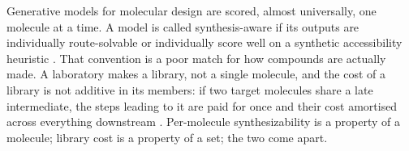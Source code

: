 \documentclass{article}
\begin{document}
%
%
%
%
%

Generative models for molecular design are scored, almost universally, one molecule at a time. A model is called synthesis-aware if its outputs are individually route-solvable or individually score well on a synthetic accessibility heuristic \citep{gao2020synthesizability,ertl2009sascore}. That convention is a poor match for how compounds are actually made. A laboratory makes a library, not a single molecule, and the cost of a library is not additive in its members: if two target molecules share a late intermediate, the steps leading to it are paid for once and their cost amortised across everything downstream \citep{fromer2024sparrow}. Per-molecule synthesizability is a property of a molecule; library cost is a property of a set; the two come apart.
\end{document}
